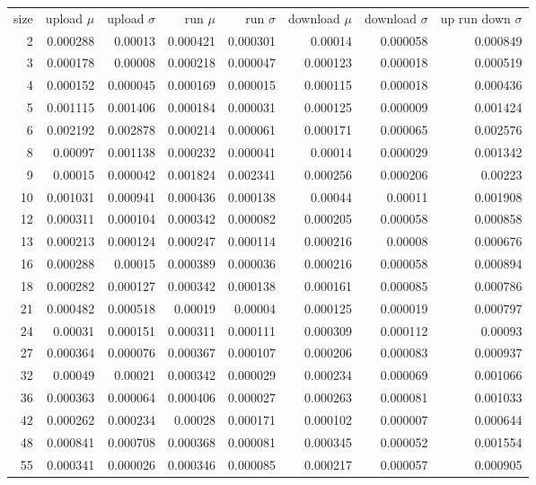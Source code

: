 \begin{tabular}{r r r r r r r r}
size & upload $\mu$  & upload $\sigma$ & run $\mu$ & run $\sigma$ & download $\mu$ & download $\sigma$ & up run down $\sigma$ \\
2 & 0.000288 & 0.00013 & 0.000421 & 0.000301 & 0.00014 & 0.000058 & 0.000849 \\
3 & 0.000178 & 0.00008 & 0.000218 & 0.000047 & 0.000123 & 0.000018 & 0.000519 \\
4 & 0.000152 & 0.000045 & 0.000169 & 0.000015 & 0.000115 & 0.000018 & 0.000436 \\
5 & 0.001115 & 0.001406 & 0.000184 & 0.000031 & 0.000125 & 0.000009 & 0.001424 \\
6 & 0.002192 & 0.002878 & 0.000214 & 0.000061 & 0.000171 & 0.000065 & 0.002576 \\
8 & 0.00097 & 0.001138 & 0.000232 & 0.000041 & 0.00014 & 0.000029 & 0.001342 \\
9 & 0.00015 & 0.000042 & 0.001824 & 0.002341 & 0.000256 & 0.000206 & 0.00223 \\
10 & 0.001031 & 0.000941 & 0.000436 & 0.000138 & 0.00044 & 0.00011 & 0.001908 \\
12 & 0.000311 & 0.000104 & 0.000342 & 0.000082 & 0.000205 & 0.000058 & 0.000858 \\
13 & 0.000213 & 0.000124 & 0.000247 & 0.000114 & 0.000216 & 0.00008 & 0.000676 \\
16 & 0.000288 & 0.00015 & 0.000389 & 0.000036 & 0.000216 & 0.000058 & 0.000894 \\
18 & 0.000282 & 0.000127 & 0.000342 & 0.000138 & 0.000161 & 0.000085 & 0.000786 \\
21 & 0.000482 & 0.000518 & 0.00019 & 0.00004 & 0.000125 & 0.000019 & 0.000797 \\
24 & 0.00031 & 0.000151 & 0.000311 & 0.000111 & 0.000309 & 0.000112 & 0.00093 \\
27 & 0.000364 & 0.000076 & 0.000367 & 0.000107 & 0.000206 & 0.000083 & 0.000937 \\
32 & 0.00049 & 0.00021 & 0.000342 & 0.000029 & 0.000234 & 0.000069 & 0.001066 \\
36 & 0.000363 & 0.000064 & 0.000406 & 0.000027 & 0.000263 & 0.000081 & 0.001033 \\
42 & 0.000262 & 0.000234 & 0.00028 & 0.000171 & 0.000102 & 0.000007 & 0.000644 \\
48 & 0.000841 & 0.000708 & 0.000368 & 0.000081 & 0.000345 & 0.000052 & 0.001554 \\
55 & 0.000341 & 0.000026 & 0.000346 & 0.000085 & 0.000217 & 0.000057 & 0.000905 \\

\end{tabular}
